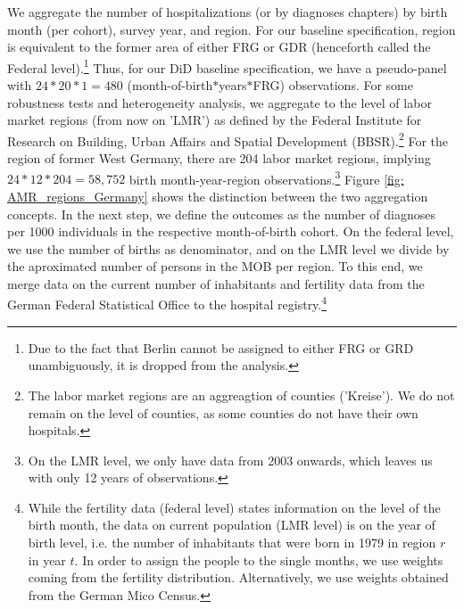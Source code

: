 \documentclass[11pt, a4paper]{article} %
\begin{document}
We aggregate the number of hospitalizations (or by diagnoses chapters) by birth month (per cohort), survey year, and region. For our baseline specification, region is equivalent to the former area of either FRG or GDR (henceforth called the Federal level).\footnote{Due to the fact that Berlin cannot be assigned to either FRG or GRD unambiguously, it is dropped from the analysis.} Thus, for our DiD baseline specification, we have a pseudo-panel with $24*20*1=480$ (month-of-birth$*$years$*$FRG) observations. For some robustness tests and heterogeneity analysis, we aggregate to the level of labor market regions (from now on 'LMR') as defined by the Federal Institute  for Research on Building, Urban Affairs and Spatial Development (BBSR).\footnote{The labor market regions are an aggreagtion of counties ('Kreise'). We do not remain on the level of counties, as some counties do not have their own hospitals.} For the region of former West Germany, there are 204 labor market regions, implying $24*12*204= 58,752$ birth month-year-region observations.\footnote{On the LMR level, we only have data from 2003 onwards, which leaves us with only 12 years of observations.} Figure \ref{fig: AMR_regions_Germany} shows the distinction between the two aggregation concepts. \newline %
In the next step, we define the outcomes as the number of diagnoses per 1000 individuals in the respective month-of-birth cohort. On the federal level, we use the number of births as denominator, and on the LMR level we divide by the aproximated number of persons in the MOB per region. To this end, we merge data on the current number of inhabitants and fertility data from the German Federal Statistical Office to the hospital registry.\footnote{While the fertility data (federal level) states information on the level of the birth month, the data on current population (LMR level) is on the year of birth level, i.e. the number of inhabitants that were born in 1979 in region $r$ in year $t$. In order to assign the people to the single months, we use weights coming from the fertility distribution. Alternatively, we use weights obtained from the German Mico Census.}\newline


\end{document}
